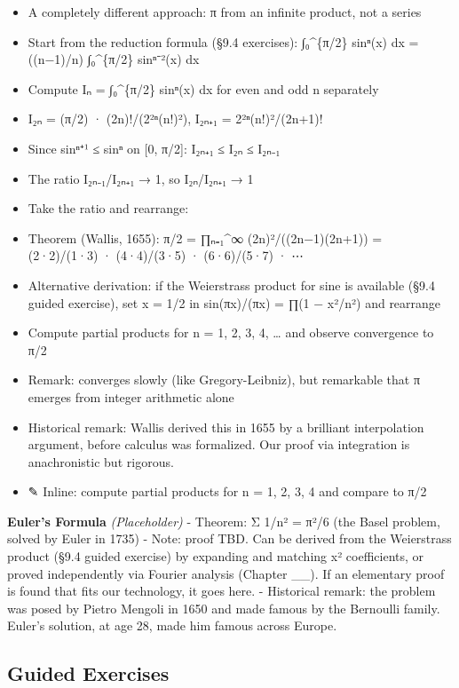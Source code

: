 \documentclass[
  10pt,
  letterpaper,
]{scrbook}
\providecommand{\tightlist}{%
  \setlength{\itemsep}{0pt}\setlength{\parskip}{0pt}}
\begin{document}
\begin{itemize}
\tightlist
\item
  A completely different approach: π from an infinite product, not a
  series
\item
  Start from the reduction formula (§9.4 exercises): ∫₀\^{}\{π/2\}
  sinⁿ(x) dx = ((n−1)/n) ∫₀\^{}\{π/2\} sinⁿ⁻²(x) dx
\item
  Compute Iₙ = ∫₀\^{}\{π/2\} sinⁿ(x) dx for even and odd n separately
\item
  I₂ₙ = (π/2) · (2n)!/(2²ⁿ(n!)²), I₂ₙ₊₁ = 2²ⁿ(n!)²/(2n+1)!
\item
  Since sinⁿ⁺¹ ≤ sinⁿ on {[}0, π/2{]}: I₂ₙ₊₁ ≤ I₂ₙ ≤ I₂ₙ₋₁
\item
  The ratio I₂ₙ₋₁/I₂ₙ₊₁ → 1, so I₂ₙ/I₂ₙ₊₁ → 1
\item
  Take the ratio and rearrange:
\item
  Theorem (Wallis, 1655): π/2 = ∏ₙ₌₁\^{}∞ (2n)²/((2n−1)(2n+1)) =
  (2·2)/(1·3) · (4·4)/(3·5) · (6·6)/(5·7) · ⋯
\item
  Alternative derivation: if the Weierstrass product for sine is
  available (§9.4 guided exercise), set x = 1/2 in sin(πx)/(πx) = ∏(1 −
  x²/n²) and rearrange
\item
  Compute partial products for n = 1, 2, 3, 4, \ldots{} and observe
  convergence to π/2
\item
  Remark: converges slowly (like Gregory-Leibniz), but remarkable that π
  emerges from integer arithmetic alone
\item
  Historical remark: Wallis derived this in 1655 by a brilliant
  interpolation argument, before calculus was formalized. Our proof via
  integration is anachronistic but rigorous.
\item
  ✎ Inline: compute partial products for n = 1, 2, 3, 4 and compare to
  π/2
\end{itemize}

\textbf{Euler's Formula} \emph{(Placeholder)} - Theorem: Σ 1/n² = π²/6
(the Basel problem, solved by Euler in 1735) - Note: proof TBD. Can be
derived from the Weierstrass product (§9.4 guided exercise) by expanding
and matching x² coefficients, or proved independently via Fourier
analysis (Chapter \_\_). If an elementary proof is found that fits our
technology, it goes here. - Historical remark: the problem was posed by
Pietro Mengoli in 1650 and made famous by the Bernoulli family. Euler's
solution, at age 28, made him famous across Europe.

\subsection{Guided Exercises}\label{guided-exercises-23}
\end{document}
